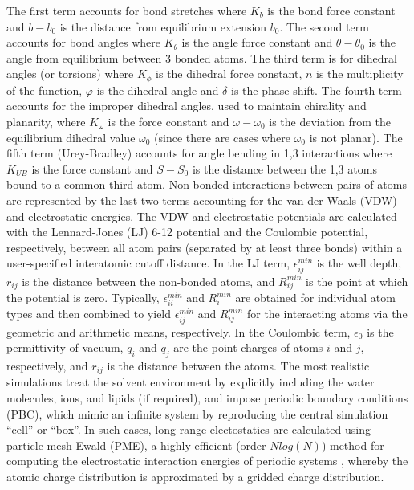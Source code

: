 The first term accounts for bond stretches where $K_b$ is the bond force constant and $b - b_{0}$ is the distance from equilibrium extension $b_{0}$. The second term accounts for bond angles where $K_\theta$ is the angle force constant and $\theta - \theta_{0}$ is the angle from equilibrium between 3 bonded atoms. The third term is for dihedral angles (or torsions) where $K_\phi$ is the dihedral force constant, $n$ is the multiplicity of the function, $\varphi$ is the dihedral angle and $\delta$ is the phase shift. The fourth term accounts for the improper dihedral angles, used to maintain chirality and planarity, where $K_\omega$ is the force constant and $\omega - \omega_{0}$ is the deviation from the equilibrium dihedral value $\omega_{0}$ (since there are cases where $\omega_{0}$ is not planar). The fifth term (Urey-Bradley) accounts for angle bending in 1,3 interactions where $K_{UB}$ is the force constant and $S - S_{0}$ is the distance between the 1,3 atoms bound to a common third atom. Non-bonded interactions between pairs of atoms are represented by the last two terms accounting for the van der Waals (VDW) and electrostatic energies. The VDW and electrostatic potentials are calculated with the Lennard-Jones (LJ) 6-12 potential and the Coulombic potential, respectively, between all atom pairs (separated by at least three bonds) within a user-specified interatomic cutoff distance. In the LJ term, $\epsilon^{min}_{ij}$ is the well depth, $r_{ij}$ is the distance between the non-bonded atoms, and $R^{min}_{ij}$ is the point at which the potential is zero. Typically, $\epsilon^{min}_{ii}$ and $R^{min}_{i}$ are obtained for individual atom types and then combined to yield $\epsilon^{min}_{ij}$ and $R^{min}_{ij}$ for the interacting atoms via the geometric and arithmetic means, respectively. In the Coulombic term, $\epsilon_0$ is the permittivity of vacuum, $q_i$ and $q_j$ are the point charges of atoms $i$ and $j$, respectively, and $r_{ij}$ is the distance between the atoms. The most realistic simulations treat the solvent environment by explicitly including the water molecules, ions, and lipids (if required), and impose periodic boundary conditions (PBC), which mimic an infinite system by reproducing the central simulation ``cell'' or ``box''. In such cases, long-range electostatics are calculated using particle mesh Ewald (PME), a highly efficient (order $Nlog(N)$) method for computing the electrostatic interaction energies of periodic systems \cite{Darden:10089,Essmann:1995p5799}, whereby the atomic charge distribution is approximated by a gridded charge distribution.

